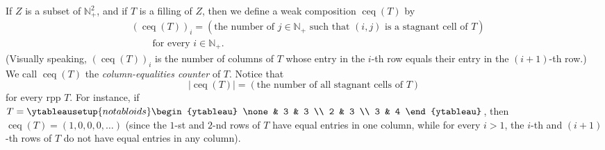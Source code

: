 \documentclass[numbers=enddot,12pt,final,onecolumn,notitlepage]{scrartcl}%
\theoremstyle{definition}
\begin{document}
If $Z$ is a subset of $\mathbb{N}_{+}^{2}$, and if $T$ is a filling of $Z$,
then we define a weak composition $\operatorname*{ceq}\left(  T\right)  $ by%
\begin{align}
&  \left(  \operatorname*{ceq}\left(  T\right)  \right)  _{i}=\left(
\text{the number of }j\in\mathbb{N}_{+}\text{ such that }\left(  i,j\right)
\text{ is a stagnant cell of }T\right) \label{eq.gtilde.ceq.def}\\
&  \ \ \ \ \ \ \ \ \ \ \text{for every }i\in\mathbb{N}_{+}.\nonumber
\end{align}
(Visually speaking, $\left(  \operatorname*{ceq}\left(  T\right)  \right)
_{i}$ is the number of columns of $T$ whose entry in the $i$-th row equals
their entry in the $\left(  i+1\right)  $-th row.) We call
$\operatorname*{ceq}\left(  T\right)  $ the \textit{column-equalities counter}
of $T$. Notice that%
\begin{equation}
\left\vert \operatorname*{ceq}\left(  T\right)  \right\vert =\left(  \text{the
number of all stagnant cells of }T\right)  \label{eq.gtilde.ceq.abs}%
\end{equation}
for every rpp $T$. For instance, if $T=%
\ytableausetup{notabloids}
\begin{ytableau}
\none& 3 & 3 \\
2 & 3 \\
3 & 4
\end{ytableau}%
$, then $\operatorname*{ceq}\left(  T\right)  =\left(  1,0,0,0,\ldots\right)
$ (since the $1$-st and $2$-nd rows of $T$ have equal entries in one column,
while for every $i>1$, the $i$-th and $\left(  i+1\right)  $-th rows of $T$ do
not have equal entries in any column).
\end{document}
